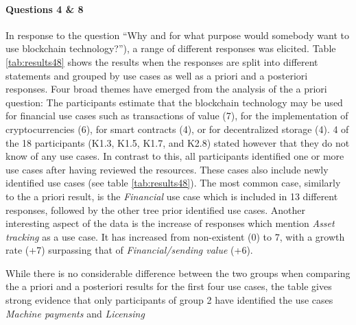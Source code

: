 \paragraph{Questions 4 \& 8} In response to the question \enquote{Why and for what purpose would somebody want to use blockchain technology?}), a range of different responses was elicited. Table \ref{tab:results48} shows the results when the responses are split into different statements and grouped by use cases as well as a priori and a posteriori responses.
Four broad themes have emerged from the analysis of the a priori question: The participants estimate that the blockchain technology may be used for financial use cases such as transactions of value (7), for the implementation of cryptocurrencies (6), for smart contracts (4), or for decentralized storage (4). 4 of the 18 participants (K1.3, K1.5, K1.7, and K2.8) stated however that they do not know of any use cases. In contrast to this, all participants identified one or more use cases after having reviewed the resources. These cases also include newly identified use cases (see table \ref{tab:results48}). The most common case, similarly to the a priori result, is the \textit{Financial} use case which is included in 13 different responses, followed by the other tree prior identified use cases.
Another interesting aspect of the data is the increase of responses which mention \textit{Asset tracking} as a use case. It has increased from non-existent (0) to 7, with a growth rate (+7) surpassing that of \textit{Financial/sending value} (+6).

While there is no considerable difference between the two groups when comparing the a priori and a posteriori results for the first four use cases, the table gives strong evidence that only participants of group 2 have identified the use cases \textit{Machine payments} and \textit{Licensing}

